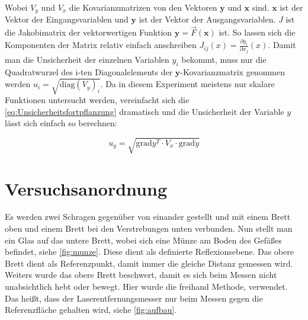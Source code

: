 \documentclass[11pt,ngerman]{scrartcl}
\begin{document}
Wobei $V_y$ und $V_x$ die Kovarianzmatrizen von den Vektoren $\bm{y}$ und $\bm{x}$ sind.
$\bm{x}$ ist der Vektor der Eingangsvariablen und $\bm{y}$ ist der Vektor der Ausgangsvariablen.
$J$ ist die Jakobimatrix der vektorwertigen Funktion $\bm{y} = \vec{F}(\bm{x})$ ist.
So lassen sich die Komponenten der Matrix relativ einfach anschreiben $J_{ij}(x) = \frac{\partial{y_i}}{\partial{x_j}}(x)$.
Damit man die Unsicherheit der einzelnen Variablen $y_i$ bekommt, muss nur die Quadratwurzel des i-ten Diagonalelements der 
$\bm{y}$-Kovarianzmatrix genommen werden $u_i= \sqrt{\mathrm{diag}(V_y)_i}$.
Da in diesem Experiment meistens nur skalare Funktionen untersucht werden, vereinfacht
sich die \autoref{eq:Unsicherheitsfortpflanzung} dramatisch und die Unsicherheit
der Variable $y$ lässt sich einfach so berechnen:

\begin{equation}
    \label{eq:graduncentainty}
    u_y = \sqrt{\mathrm{grad} y^T \cdot V_x \cdot \mathrm{grad} y}
\end{equation}

\section{Versuchsanordnung}
\label{sec:versuchsanordnung}

Es werden zwei Schragen gegenüber von einander gestellt und mit einem Brett
oben und einem Brett bei den Verstrebungen unten verbunden. Nun stellt man ein
Glas auf das untere Brett, wobei sich eine Münze am Boden des Gefäßes befindet,
siehe \autoref{fig:munze}.  Diese dient als definierte Reflexionsebene. Das
obere Brett dient als Referenzpunkt, damit immer die gleiche Distanz gemessen
wird. Weiters wurde das obere Brett beschwert, damit es sich beim Messen nicht
unabsichtlich hebt oder bewegt. Hier wurde die freihand Methode, verwendet.
Das heißt, dass der Laserentfernungsmesser nur beim Messen gegen die
Referenzfläche gehalten wird, siehe \autoref{fig:aufbau}.
\end{document}
